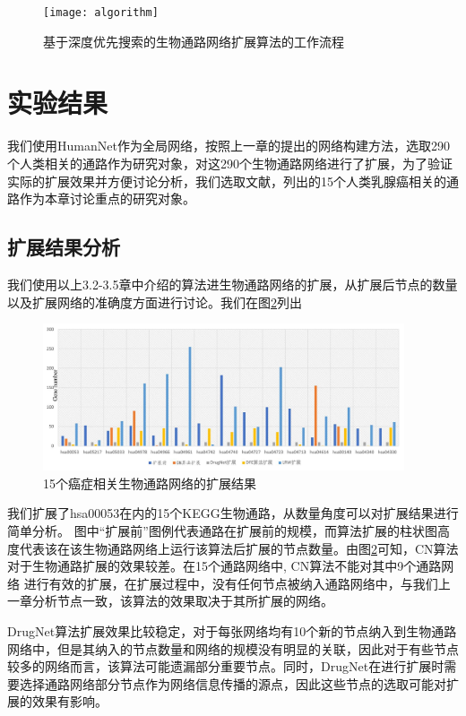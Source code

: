 \begin{figure}[h]
\centering
\texttt{[image: algorithm]}
\caption[algorithm]{基于深度优先搜索的生物通路网络扩展算法的工作流程}
\label{algorithm}
\end{figure}


 \section{实验结果}
 我们使用HumanNet作为全局网络，按照上一章的提出的网络构建方法，选取290个人类相关的通路作为研究对象，对这290个生物通路网络进行了扩展，为了验证实际的扩展效果并方便讨论分析，我们选取文献\cite{zhang2016network}，列出的15个人类乳腺癌相关的通路作为本章讨论重点的研究对象。
 \subsection{扩展结果分析}
 我们使用以上3.2-3.5章中介绍的算法进生物通路网络的扩展，从扩展后节点的数量以及扩展网络的准确度方面进行讨论。我们在图\ref{allexpansion}列出
 \begin{figure}[h]
\centering
\includegraphics[width = 0.95\textwidth]{allexpansion}
\caption[allexpansion]{15个癌症相关生物通路网络的扩展结果}
\label{allexpansion}
\end{figure}

我们扩展了hsa00053在内的15个KEGG\cite{kanehisa2008kegg}生物通路，从数量角度可以对扩展结果进行简单分析。
图中“扩展前”图例代表通路在扩展前的规模，而算法扩展的柱状图高度代表该在该生物通路网络上运行该算法后扩展的节点数量。由图\ref{allexpansion}可知，CN算法对于生物通路扩展的效果较差。在15个通路网络中, CN算法不能对其中9个通路网络
进行有效的扩展，在扩展过程中，没有任何节点被纳入通路网络中，与我们上一章分析节点一致，该算法的效果取决于其所扩展的网络。

DrugNet算法扩展效果比较稳定，对于每张网络均有10个新的节点纳入到生物通路网络中，但是其纳入的节点数量和网络的规模没有明显的关联，因此对于有些节点较多的网络而言，该算法可能遗漏部分重要节点。同时，DrugNet在进行扩展时需要选择通路网络部分节点作为网络信息传播的源点，因此这些节点的选取可能对扩展的效果有影响。


